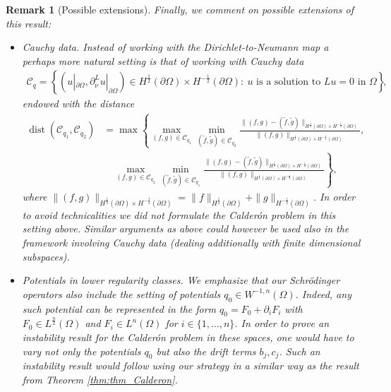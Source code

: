 \documentclass[12pt,twoside]{amsart}
\numberwithin{equation}{section}
\newtheorem{remark}[theorem]{Remark}
\newcommand {\p} {\partial}
\DeclareMathOperator {\dist} {dist}
\begin{document}
\begin{remark}[Possible extensions]
\label{rmk:gen_Cald}
Finally, we comment on possible extensions of this result: 
\begin{itemize}
\item \emph{Cauchy data.} Instead of working with the Dirichlet-to-Neumann map a perhaps more natural setting is that of working with Cauchy data
\begin{align*}
\mathcal{C}_q = \left\{ \left( u|_{\partial \Omega}, \p_{\nu}^L u|_{\partial \Omega} \right) \in H^{\frac{1}{2}}(\partial \Omega) \times H^{-\frac{1}{2}}(\partial \Omega): \ u \mbox{ is a solution to } Lu = 0 \mbox{ in } \Omega \right\},
\end{align*}
endowed with the distance
\begin{align*}
\dist(\mathcal{C}_{q_1}, \mathcal{C}_{q_2})
&= \max\left\{ \max\limits_{(f,g)\in \mathcal{C}_{q_1}} \min\limits_{(\tilde{f},\tilde{g})\in \mathcal{C}_{q_2}} \frac{\|(f,g)-(\tilde{f},\tilde{g})\|_{H^{\frac{1}{2}}(\partial \Omega) \times H^{-\frac{1}{2}}(\partial \Omega)}}{\|(f,g)\|_{H^{\frac{1}{2}}(\partial \Omega) \times H^{-\frac{1}{2}}(\partial \Omega)}}, \right.\\
& \quad \left. \max\limits_{(f,g)\in \mathcal{C}_{q_2}} \min\limits_{(\tilde{f},\tilde{g})\in \mathcal{C}_{q_1}} \frac{\|(f,g)-(\tilde{f},\tilde{g})\|_{H^{\frac{1}{2}}(\partial \Omega) \times H^{-\frac{1}{2}}(\partial \Omega)}}{\|(f,g)\|_{H^{\frac{1}{2}}(\partial \Omega) \times H^{-\frac{1}{2}}(\partial \Omega)}} \right\} ,
\end{align*}
where $\|(f,g)\|_{H^{\frac{1}{2}}(\partial \Omega) \times H^{-\frac{1}{2}}(\partial \Omega)} = \|f\|_{H^{\frac{1}{2}}(\partial \Omega)} + \|g\|_{H^{-\frac{1}{2}}(\partial \Omega)}$. In order to avoid technicalities we did not formulate the Calder\'on problem in this setting above. Similar arguments as above could however be used also in the framework involving Cauchy data (dealing additionally with finite dimensional subspaces).
\item \emph{Potentials in lower regularity classes.}
We emphasize that our Schr{\"o}dinger operators also include the setting of potentials $q_0 \in W^{-1,n}(\Omega)$. Indeed, any such potential can be represented in the form $q_0 = F_0 + \p_i F_i$ with $F_0 \in L^{\frac{n}{2}}(\Omega)$ and $F_i \in L^{n}(\Omega)$ for $i\in \{1,\dots,n\}$. In order to prove an instability result for the Calder\'on problem in these spaces, one would have to vary not only the potentials $q_0$ but also the drift terms $b_j, c_j$. Such an instability result would follow using our strategy in a similar way as the result from Theorem \ref{thm:thm_Calderon}.
\end{itemize}
\end{remark}
\end{document}
